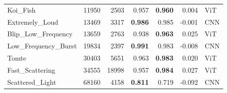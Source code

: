 \documentclass[12pt]{article}
\begin{document}
\begin{table}
\begin{tabular}{lrrrrrl}
Koi\_Fish & 11950 & 2503 & 0.957 & \textbf{0.960} & 0.004 & ViT \\
Extremely\_Loud & 13469 & 3317 & \textbf{0.986} & 0.985 & -0.001 & CNN \\
Blip\_Low\_Frequency & 13659 & 2763 & 0.938 & \textbf{0.963} & 0.025 & ViT \\
Low\_Frequency\_Burst & 19834 & 2397 & \textbf{0.991} & 0.983 & -0.008 & CNN \\
Tomte & 30403 & 5651 & 0.963 & \textbf{0.983} & 0.020 & ViT \\
Fast\_Scattering & 34555 & 18998 & 0.957 & \textbf{0.984} & 0.027 & ViT \\
Scattered\_Light & 68160 & 4158 & \textbf{0.811} & 0.719 & -0.092 & CNN \\
\hline\hline
\end{tabular}
\end{table}
\end{document}
